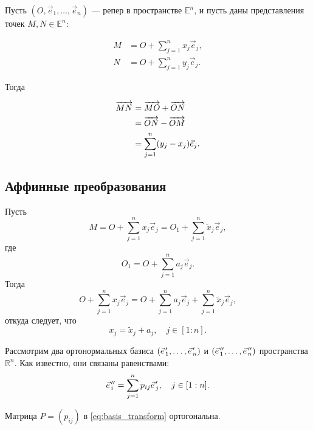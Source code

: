 Пусть $(O, \vec{e}_1, \dots, \vec{e}_n)$ --- репер в пространстве
$\mathbb{E}^n$, и пусть даны представления точек $M,N \in \mathbb{E}^n$:

\begin{equation}
  \begin{aligned}
    M &= O + \sum_{j=1}^n x_j \vec{e}_j, \\
    N &= O + \sum_{j=1}^n y_j \vec{e}_j.
  \end{aligned}
\end{equation}

Тогда

\begin{equation}
  \begin{aligned}
    \overrightarrow{MN} &= \overrightarrow{MO} + \overrightarrow{ON} \\
    &= \overrightarrow{ON} - \overrightarrow{OM} \\
    &= \sum_{j=1}^n (y_j - x_j) \vec{e}_j.
  \end{aligned}
\end{equation}

\subsection{Аффинные преобразования}

Пусть
\begin{equation}
  M = O + \sum_{j=1}^n x_j \vec{e}_j = O_1 + \sum_{j=1}^n \tilde{x}_j \vec{e}_j,
\end{equation}
где
\begin{equation}
  O_1 = O + \sum_{j=1}^n a_j \vec{e}_j.
\end{equation}
Тогда
\begin{equation*}
  O + \sum_{j=1}^n x_j \vec{e}_j = O + \sum_{j=1}^n a_j \vec{e}_j +
    \sum_{j=1}^n \tilde{x}_j \vec{e}_j,
\end{equation*}
откуда следует, что
\begin{equation}
  x_j = \tilde{x}_j + a_j, \quad j \in [1:n].
\end{equation}

Рассмотрим два ортонормальных базиса $(\pvec{e}_1, \dots, \pvec{e}_n)$ и
$(\ppvec{e}_1, \dots,  \ppvec{e}_n)$ пространства $\mathbb{R}^n$. Как
известно, они связаны равенствами:
\begin{equation}
  \label{eq:basis_transform}
  \ppvec{e}_i = \sum_{j=1}^n p_{ij} \pvec{e}_j, \quad j \in [1:n].
\end{equation}

\begin{theorem}
  Матрица $P = (p_{ij})$ в \autoref{eq:basis_transform} ортогональна.
\end{theorem}

